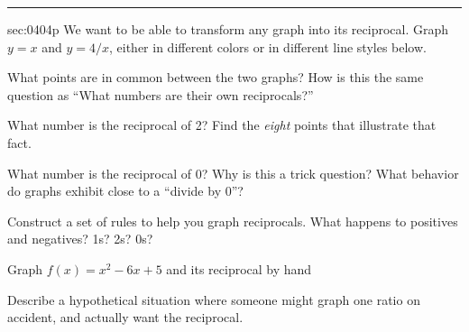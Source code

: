 \renewcommand{\columnseprule}{1.5pt}
\begin{multicols*}{2}
\rule[0.5\baselineskip]{0.4\textwidth}{1pt}
\noindent
{}\label{sec:0404p}
\begin{exercises}{sec:0404p}
\lab{} We want to be able to transform any graph into its reciprocal.  Graph $y=x$ and $y=4/x$, either in different colors or in different line styles below.

\noindent
{}

\lab{} What points are in common between the two graphs?  How is this the same question as “What numbers are their own reciprocals?”

\vspace{3cm}
\lab{} What number is the reciprocal of 2?  Find the \emph{eight} points that illustrate that fact.


\vspace{4cm}
\lab{}  What number is the reciprocal of 0?  Why is this a trick question?  What behavior do graphs exhibit close to a ``divide by 0''?

\vspace{3cm}
\lab{} Construct a set of rules to help you graph reciprocals.  What happens to positives and negatives?  1s?  2s?  0s?


\vspace{4cm}
\lab{} Graph $f(x)=x^2-6x+5$ and its reciprocal by hand

\noindent
{}

\lab{} Describe a hypothetical situation where someone might graph one ratio on accident, and actually want the reciprocal.


\end{exercises}
\end{multicols*}